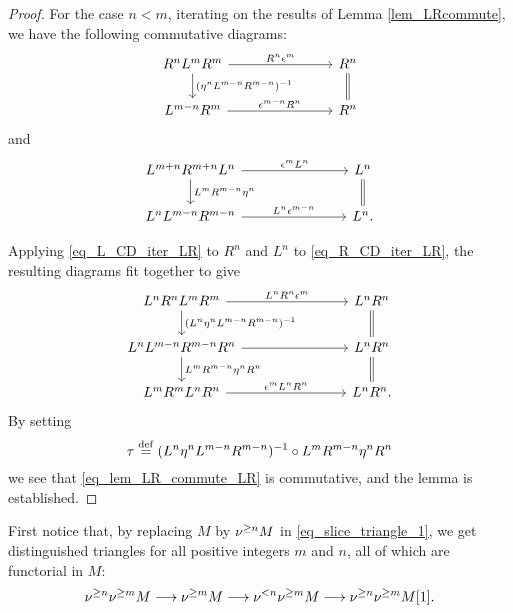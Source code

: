 \begin{proof}
For the case $n < m$, iterating on the results of Lemma 
\ref{lem_LRcommute}, we have the following commutative diagrams: 
\begin{equation}\label{eq_R_CD_iter_LR}
\begin{tikzcd}[column sep=75pt]
R^nL^mR^m \arrow{r}{R^n \cuHI^m}
\arrow{d}{(\eta^nL^{m - n}R^{m - n})^{-1}} &
R^n \arrow[equals]{d} \\
L^{m - n}R^m \arrow{r}{\cuHI^{m - n}R^n} &
R^n 
\end{tikzcd}
\end{equation}
and
\begin{equation}\label{eq_L_CD_iter_LR}
\begin{tikzcd}[column sep=75pt]
L^{m + n}R^{m + n}L^n \arrow{r}{\cuHI^m L^n} 
   \arrow{d}{L^m R^{m - n}\eta^n} &
L^n \arrow[equals]{d} \\
L^nL^{m - n}R^{m - n} \arrow{r}{L^n\cuHI^{m - n}} &
L^n.
\end{tikzcd}
\end{equation}

Applying \eqref{eq_L_CD_iter_LR} to $R^n$ and $L^n$ to 
\eqref{eq_R_CD_iter_LR}, the resulting diagrams fit together to 
give
\[
\begin{tikzcd}[column sep=75pt]
L^nR^n L^mR^m \arrow{r}{L^nR^n \cuHI^m}
\arrow{d}{(L^n\eta^nL^{m - n}R^{m - n})^{-1}} &
L^nR^n \arrow[equals]{d} \\
L^nL^{m - n} R^{m - n}R^n \arrow{r} 
\arrow{d}{L^mR^{m - n}\eta^nR^n}&
L^nR^n \arrow[equals]{d} \\
L^mR^mL^nR^n \arrow{r}{\cuHI^m L^nR^n} &
L^nR^n.
\end{tikzcd}
\]
By setting
\[
\tau \stackrel{\mathrm{def}}{=} (L^n\eta^nL^{m - n}R^{m - n})^{-1} \circ
L^mR^{m - n}\eta^nR^n
\]
we see that \eqref{eq_lem_LR_commute_LR} is commutative, and the 
lemma is established.
\end{proof}

First notice that, by replacing $M$ by $\nu^{\geq n} M$ in 
\eqref{eq_slice_triangle_1}, we get distinguished triangles for 
all positive integers $m$ and $n$, all of which are functorial in 
$M$:
\begin{equation*}\label{eq_slice_triangle_2}
\nu^{\geq n}\nu^{\geq m} M \longrightarrow \nu^{\geq m}M \longrightarrow \nu^{< n}\nu^{\geq m}M \longrightarrow 
   \nu^{\geq n}\nu^{\geq m} M[1].
\end{equation*}

